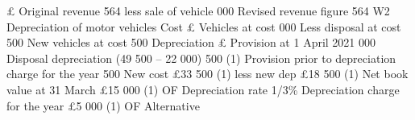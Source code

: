 \documentclass{article}
\begin{document}
£ \newline
Original revenue  564 \newline
less sale of vehicle  000 \newline
Revised revenue figure  564 \newline
 \newline
 \newline
W2 Depreciation of motor vehicles \newline
 \newline
Cost \newline
£ \newline
Vehicles at cost  000 \newline
Less disposal at cost  500 \newline
New vehicles at cost  500 \newline
 \newline
Depreciation \newline
£ \newline
Provision at 1 April 2021  000  \newline
Disposal depreciation (49 500 – 22 000)  500 (1) \newline
Provision prior to depreciation charge for the year  500  \newline
 \newline
 \newline
New cost \newline
£33 500  (1) \newline
less new dep \newline
£18 500  (1) \newline
Net book value at 31 March \newline
£15 000  (1) OF \newline
Depreciation rate  1/3\%  \newline
Depreciation charge for the year \newline
£5 000  (1) OF \newline
 \newline
Alternative \newline
\end{document}

